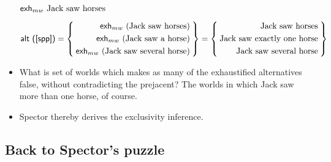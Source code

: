 \documentclass[landscape,twocolumn,cronos,paper=letter]{ling-handout}
\begin{document}
\begin{itemize}
     \ex
     \label{spp}\(\ml{exh}_{mw} \text{Jack saw horses}\)
     \xe

     \ex
     \(\ml{alt (\ref{spp})} = \Set{\begin{aligned}[c]
         \ml{exh}_{mw} (\text{Jack saw horses})\\
         \ml{exh}_{mw} (\text{Jack saw a horse})\\
         \ml{exh}_{mw} (\text{Jack saw several horse})
       \end{aligned}} = \Set{\begin{aligned}[c]
         \text{Jack saw horses}\\
         \text{Jack saw exactly one horse}\\
         \text{Jack saw several horse}
       \end{aligned}}\)
     \xe

     \item What is set of worlds which makes as many of the exhaustified
     alternatives false, without contradicting the prejacent? The worlds in
     which Jack saw more than one horse, of course.

     \item Spector thereby derives the exclusivity inference.

\end{itemize}

\subsection{Back to Spector's puzzle}
\end{document}

